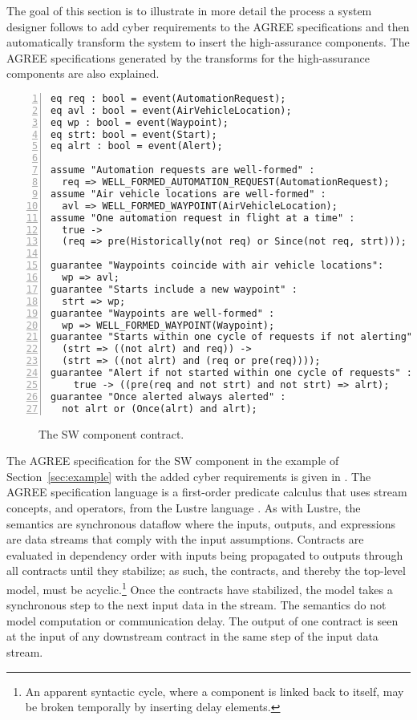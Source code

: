 The goal of this section is to illustrate in more detail the process a system designer follows to add cyber requirements to the AGREE specifications and then automatically transform the system to insert the high-assurance components.
The AGREE specifications generated by the transforms for the high-assurance components are also explained. 

\newsavebox{\sw}
\begin{lrbox}{\sw}
\begin{lstlisting}[style=agree,numbers=left]
eq req : bool = event(AutomationRequest);
eq avl : bool = event(AirVehicleLocation);
eq wp : bool = event(Waypoint);
eq strt: bool = event(Start);
eq alrt : bool = event(Alert);

assume "Automation requests are well-formed" :
  req => WELL_FORMED_AUTOMATION_REQUEST(AutomationRequest);
assume "Air vehicle locations are well-formed" :
  avl => WELL_FORMED_WAYPOINT(AirVehicleLocation);    
assume "One automation request in flight at a time" :
  true -> 
  (req => pre(Historically(not req) or Since(not req, strt)));
      
guarantee "Waypoints coincide with air vehicle locations":
  wp => avl;
guarantee "Starts include a new waypoint" :
  strt => wp;
guarantee "Waypoints are well-formed" : 
  wp => WELL_FORMED_WAYPOINT(Waypoint);
guarantee "Starts within one cycle of requests if not alerting" :
  (strt => ((not alrt) and req)) -> 
  (strt => ((not alrt) and (req or pre(req))));
guarantee "Alert if not started within one cycle of requests" :
    true -> ((pre(req and not strt) and not strt) => alrt);
guarantee "Once alerted always alerted" :
  not alrt or (Once(alrt) and alrt);
\end{lstlisting}
\end{lrbox}

\begin{figure}
  \begin{center}
    \scalebox{0.62}{\usebox{\sw}}
  \end{center}
  \caption{The SW component contract.}
  \label{fig:sw}
\end{figure}

The AGREE specification for the SW component in the example of Section~\ref{sec:example} with the added cyber requirements is given in .
The AGREE specification language is a first-order predicate calculus that uses stream concepts, and operators, from the Lustre language \cite{10.1145/41625.41641}.
As with Lustre, the semantics are synchronous dataflow where the inputs, outputs, and expressions are data streams that comply with the input assumptions.
Contracts are evaluated in dependency order with inputs being propagated to outputs through all contracts until they stabilize; as such, the contracts, and thereby the top-level model, must be acyclic.\footnote{An apparent syntactic cycle, where a component is linked back to itself, may be broken temporally by inserting delay elements.}
Once the contracts have stabilized, the model takes a synchronous step to the next input data in the stream.
The semantics do not model computation or communication delay.
The output of one contract is seen at the input of any downstream contract in the same step of the input data stream.

